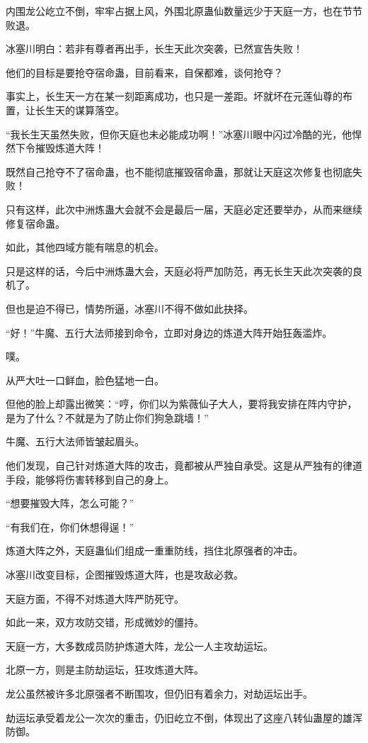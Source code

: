 \begin{this_body}
内围龙公屹立不倒，牢牢占据上风，外围北原蛊仙数量远少于天庭一方，也在节节败退。

冰塞川明白：若非有尊者再出手，长生天此次突袭，已然宣告失败！

他们的目标是要抢夺宿命蛊，目前看来，自保都难，谈何抢夺？

事实上，长生天一方在某一刻距离成功，也只是一差距。坏就坏在元莲仙尊的布置，让长生天的谋算落空。

“我长生天虽然失败，但你天庭也未必能成功啊！”冰塞川眼中闪过冷酷的光，他悍然下令摧毁炼道大阵！

既然自己抢夺不了宿命蛊，也不能彻底摧毁宿命蛊，那就让天庭这次修复也彻底失败！

只有这样，此次中洲炼蛊大会就不会是最后一届，天庭必定还要举办，从而来继续修复宿命蛊。

如此，其他四域方能有喘息的机会。

只是这样的话，今后中洲炼蛊大会，天庭必将严加防范，再无长生天此次突袭的良机了。

但也是迫不得已，情势所逼，冰塞川不得不做如此抉择。

“好！”牛魔、五行大法师接到命令，立即对身边的炼道大阵开始狂轰滥炸。

噗。

从严大吐一口鲜血，脸色猛地一白。

但他的脸上却露出微笑：“哼，你们以为紫薇仙子大人，要将我安排在阵内守护，是为了什么？不就是为了防止你们狗急跳墙！”

牛魔、五行大法师皆皱起眉头。

他们发现，自己针对炼道大阵的攻击，竟都被从严独自承受。这是从严独有的律道手段，能够将伤害转移到自己的身上。

“想要摧毁大阵，怎么可能？”

“有我们在，你们休想得逞！”

炼道大阵之外，天庭蛊仙们组成一重重防线，挡住北原强者的冲击。

冰塞川改变目标，企图摧毁炼道大阵，也是攻敌必救。

天庭方面，不得不对炼道大阵严防死守。

如此一来，双方攻防交错，形成微妙的僵持。

天庭一方，大多数成员防护炼道大阵，龙公一人主攻劫运坛。

北原一方，则是主防劫运坛，狂攻炼道大阵。

龙公虽然被许多北原强者不断围攻，但仍旧有着余力，对劫运坛出手。

劫运坛承受着龙公一次次的重击，仍旧屹立不倒，体现出了这座八转仙蛊屋的雄浑防御。


\end{this_body}
